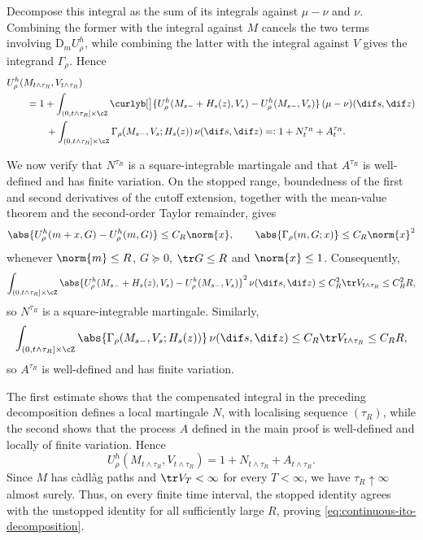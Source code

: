 \documentclass[11pt]{article}
\begin{document}
Decompose this integral as the sum of its integrals against $\mu-\nu$ and $\nu$. Combining the former with the integral against $M$ cancels the two terms involving $\mathrm{D}_mU_\rho^h$, while combining the latter with the integral against $V$ gives the integrand $\Gamma_\rho$. Hence
\begin{align*}
  &U_\rho^h(M_{t\wedge\tau_R},V_{t\wedge\tau_R}) \\
  &\qquad=1+\int_{(0,t\wedge\tau_R]\times\cZ}\curlyb[\big]{U_\rho^h(M_{s-}+H_s(z),V_s)-U_\rho^h(M_{s-},V_s)}\,(\mu-\nu)(\dif s,\dif z)\\
  &\qquad\qquad+\int_{(0,t\wedge\tau_R]\times\cZ}\Gamma_\rho(M_{s-},V_s;H_s(z))\,\nu(\dif s,\dif z)
  =:1+N_t^{\tau_R}+A_t^{\tau_R}.
\end{align*}

We now verify that $N^{\tau_R}$ is a square-integrable martingale and that $A^{\tau_R}$ is well-defined and has finite variation. On the stopped range, boundedness of the first and second derivatives of the cutoff extension, together with the mean-value theorem and the second-order Taylor remainder, gives
\[
  \abs{U_\rho^h(m+x,G)-U_\rho^h(m,G)}\leq C_R\norm{x},\qquad
  \abs{\Gamma_\rho(m,G;x)}\leq C_R\norm{x}^2
\]
whenever $\norm{m}\leq R$, $G\succeq0$, $\tr G\leq R$ and $\norm{x}\leq1$. Consequently,
\[
  \int_{(0,t\wedge\tau_R]\times\cZ}\abs{U_\rho^h(M_{s-}+H_s(z),V_s)-U_\rho^h(M_{s-},V_s)}^2\,\nu(\dif s,\dif z)
  \leq C_R^2\tr V_{t\wedge\tau_R}\leq C_R^2R,
\]
so $N^{\tau_R}$ is a square-integrable martingale. Similarly,
\[
  \int_{(0,t\wedge\tau_R]\times\cZ}\abs{\Gamma_\rho(M_{s-},V_s;H_s(z))}\,\nu(\dif s,\dif z)
  \leq C_R\tr V_{t\wedge\tau_R}\leq C_RR,
\]
so $A^{\tau_R}$ is well-defined and has finite variation.

The first estimate shows that the compensated integral in the preceding decomposition defines a local martingale $N$, with localising sequence $(\tau_R)$, while the second shows that the process $A$ defined in the main proof is well-defined and locally of finite variation. Hence
\[
  U_\rho^h(M_{t\wedge\tau_R},V_{t\wedge\tau_R})
  =
  1+N_{t\wedge\tau_R}+A_{t\wedge\tau_R}.
\]
Since $M$ has càdlàg paths and $\tr V_T<\infty$ for every $T<\infty$, we have $\tau_R\uparrow\infty$ almost surely. Thus, on every finite time interval, the stopped identity agrees with the unstopped identity for all sufficiently large $R$, proving \eqref{eq:continuous-ito-decomposition}.
\end{document}
